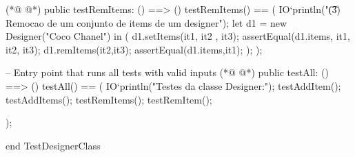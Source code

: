 \begin{vdmpp}[breaklines=true]
(*@
\label{testRemItems:59}
@*)
 public testRemItems: () ==> ()
 testRemItems() == (
  IO`println("\t (3) Remocao de um conjunto de items de um designer");
   let d1 = new Designer("Coco Chanel") in (
    d1.setItems({it1, it2 , it3});
    assertEqual(d1.items, {it1, it2, it3});
    d1.remItems({it2,it3});
    assertEqual(d1.items,{it1});
  );
 );
 

 
 
 -- Entry point that runs all tests with valid inputs
(*@
\label{testAll:74}
@*)
  public testAll: () ==> ()
  testAll() == (
  IO`println("Testes da classe Designer:");
    testAddItem();
    testAddItems();
    testRemItems();
    testRemItem();
    
  );
 
end TestDesignerClass
\end{vdmpp}


